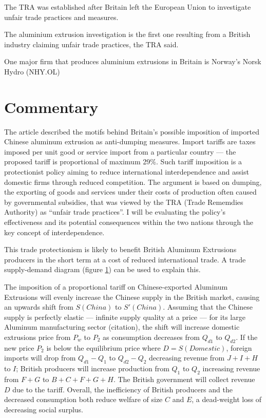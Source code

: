 \documentclass[a4paper,12pt]{article}
\newcommand{\tikzfig}[1]{}
\begin{document}
The TRA was established after Britain left the European Union to investigate unfair trade practices and measures.

The aluminium extrusion investigation is the first one resulting from a British industry claiming unfair trade practices, the TRA said.

One major firm that produces aluminium extrusions in Britain is Norway's Norsk Hydro (NHY.OL)

\newpage
\section*{Commentary}


The article described the motifs behind Britain's possible imposition of imported Chinese aluminum extrusion as anti-dumping measures. Import tariffs are taxes imposed per unit good or service import from a particular country --- the proposed tariff is proportional of maximum 29\%. Such tariff imposition is a protectionist policy aiming to reduce international interdependence and assist domestic firms through reduced competition. The argument is based on dumping, the exporting of goods and services under their costs of production often caused by governmental subsidies, that was viewed by the TRA (Trade Rememdies Authority) as ``unfair trade practices''. I will be evaluating the policy's effectiveness and its potential consequences within the two nations through the key concept of interdependence.

This trade protectionism is likely to benefit British Aluminum Extrusions producers in the short term at a cost of reduced international trade. A trade supply-demand diagram (figure \ref{fig:tariff}) can be used to explain this.

\begin{figure}[H]
	\centering
	 \tikzfig{assets/tariffs.txt}
	\caption{}
	\label{fig:tariff}
\end{figure}

The imposition of a proportional tariff on Chinese-exported Aluminum Extrusions will evenly increase the Chinese supply in the British market, causing an upwards shift from $S(China)$ to $S'(China)$. Assuming that the Chinese supply is perfectly elastic --- infinite supply quality at a price --- for its large Aluminum manufacturing sector (citation), the shift will increase domestic extrusions price from $P_w$ to $P_2$ as consumption decreases from $Q_{d1}$ to $Q_{d2}$. If the new price $P_2$ is below the equilibrium price where $D=S(Domestic)$, foreign imports will drop from $Q_{d1}-Q_{1}$ to $Q_{d2}-Q_{2}$ decreasing revenue from $J+I+H$ to $I$; British producers will increase production from $Q_1$ to $Q_2$ increasing revenue from $F+G$ to $B+C+F+G+H$. The British government will collect revenue $D$ due to the tariff. Overall, the inefficiency of British producers and the decreased consumption both reduce welfare of size $C$ and $E$, a dead-weight loss of decreasing social surplus.
\end{document}
